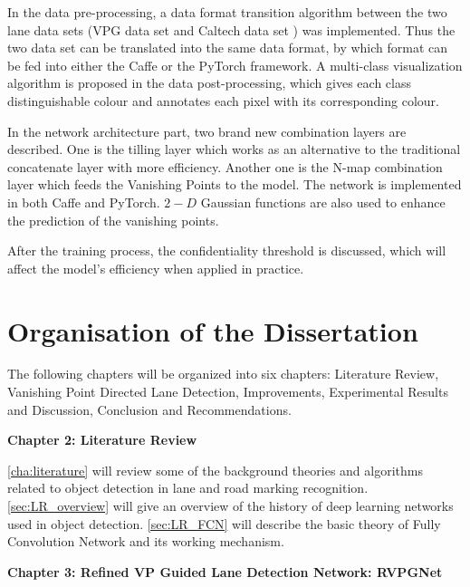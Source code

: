 \begin{spacing}{1.5}
In the data pre-processing, a data format transition algorithm between the two lane data sets (VPG data set \cite{lee2017vpgnet} and Caltech data set \cite{aly2008real}) was implemented. Thus the two data set can be translated into the same data format, by which format can be fed into either the Caffe or the PyTorch framework. A multi-class visualization algorithm is proposed in the data post-processing, which gives each class distinguishable colour and annotates each pixel with its corresponding colour.

In the network architecture part, two brand new combination layers are described. One is the tilling layer which works as an alternative to the traditional concatenate layer with more efficiency. Another one is the N-map combination layer which feeds the Vanishing Points to the model. The network is implemented in both Caffe and PyTorch. $2-D$ Gaussian functions are also used to enhance the prediction of the vanishing points.

After the training process, the confidentiality threshold is discussed, which will affect the model's efficiency when applied in practice.

\section{Organisation of the Dissertation}
\label{sec:IN_organisation}

The following chapters will be organized into six chapters: Literature Review, Vanishing Point Directed Lane Detection, Improvements, Experimental Results and Discussion, Conclusion and Recommendations.

{\large\textbf{Chapter 2: Literature Review}}

\autoref{cha:literature} will review some of the background theories and algorithms related to object detection in lane and road marking recognition. \autoref{sec:LR_overview} will give an overview of the history of deep learning networks used in object detection. \autoref{sec:LR_FCN} will describe the basic theory of Fully Convolution Network and its working mechanism. 

{\large\textbf{Chapter 3: Refined VP Guided Lane Detection Network: RVPGNet}}


\end{spacing}
